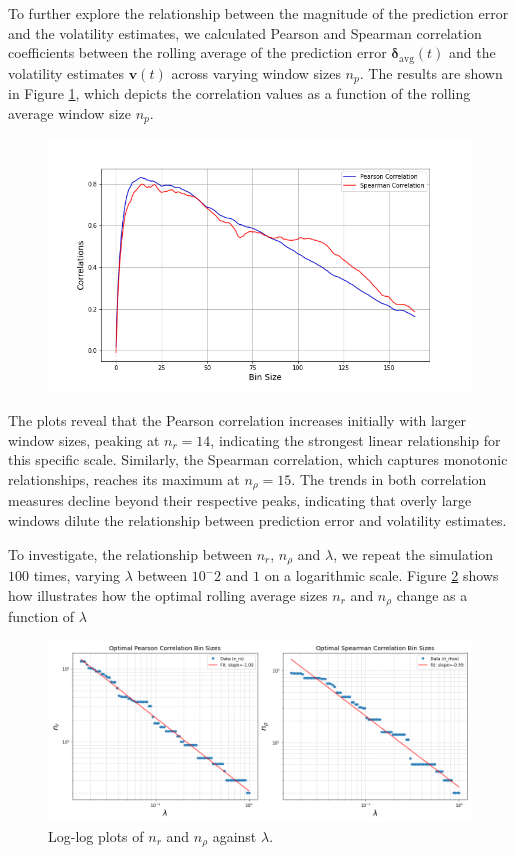 \documentclass[12pt]{article}
\theoremstyle{definition}
\begin{document}
To further explore the relationship between the magnitude of the prediction error and the volatility estimates, we calculated Pearson and Spearman correlation coefficients between the rolling average of the prediction error $\mathbf{\delta}_{\text{avg}}(t)$ and the volatility estimates $\mathbf{v}(t)$ across varying window sizes $n_p$. The results are shown in Figure \ref{fig:correlation_1}, which depicts the correlation values as a function of the rolling average window size $n_p$.

\begin{figure}[H]
    \centering
    \includegraphics[scale=0.5]{../Figures/correlations1.png}
    \caption{
    }
    \label{fig:correlation_1}
\end{figure}

The plots reveal that the Pearson correlation increases initially with larger window sizes, peaking at $n_r = 14$, indicating the strongest linear relationship for this specific scale. Similarly, the Spearman correlation, which captures monotonic relationships, reaches its maximum at $n_\rho = 15$. 
The trends in both correlation measures decline beyond their respective peaks, indicating that overly large windows dilute the relationship between prediction error and volatility estimates.

To investigate, the relationship between $n_r$, $n_\rho$ and $\lambda$, we repeat the simulation $100$ times, varying $\lambda$ between $10^-2$ and $1$ on a logarithmic scale. 
Figure \ref{fig:exp1_cors.png} shows how illustrates how the optimal rolling average sizes $n_r$ and $n_\rho$ change as a function of $\lambda$


\begin{figure}[H]
    \centering
    \includegraphics[scale=0.5]{../Figures/regression1.png}
    \caption{Log-log plots of $n_r$ and $n_\rho$ against $\lambda$.}
    \label{fig:exp1_cors.png}
\end{figure}
     
\end{document}
